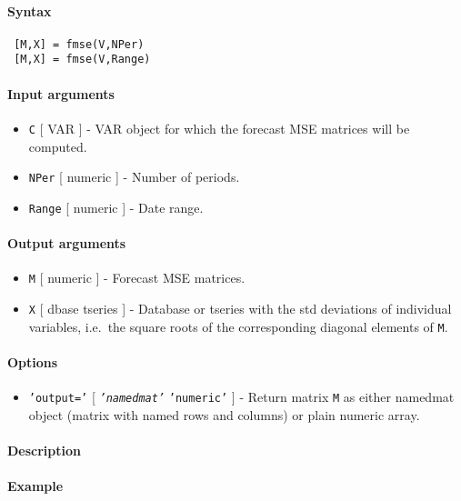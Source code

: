


	\paragraph{Syntax}
 
 \begin{verbatim}
 [M,X] = fmse(V,NPer)
 [M,X] = fmse(V,Range)
 \end{verbatim}
 
 \paragraph{Input arguments}
 
 \begin{itemize}
 \item
   \texttt{C} {[} VAR {]} - VAR object for which the forecast MSE
   matrices will be computed.
 \item
   \texttt{NPer} {[} numeric {]} - Number of periods.
 \item
   \texttt{Range} {[} numeric {]} - Date range.
 \end{itemize}
 
 \paragraph{Output arguments}
 
 \begin{itemize}
 \item
   \texttt{M} {[} numeric {]} - Forecast MSE matrices.
 \item
   \texttt{X} {[} dbase \textbar{} tseries {]} - Database or tseries with
   the std deviations of individual variables, i.e.~the square roots of
   the corresponding diagonal elements of \texttt{M}.
 \end{itemize}
 
 \paragraph{Options}
 
 \begin{itemize}
 \item
   \texttt{'output='} {[} \emph{\texttt{'namedmat'}} \textbar{}
   \texttt{'numeric'} {]} - Return matrix \texttt{M} as either namedmat
   object (matrix with named rows and columns) or plain numeric array.
 \end{itemize}
 
 \paragraph{Description}
 
 \paragraph{Example}


